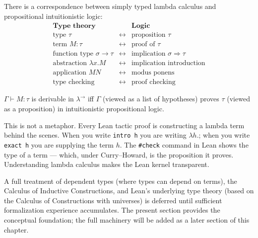 \begin{tcolorbox}[colback=thmbox, colframe=thmborder, arc=2pt,
  left=6pt, right=6pt, top=4pt, bottom=4pt,
  title={\small\textbf{Theorem (Curry--Howard Correspondence)}},
  fonttitle=\small\bfseries]
\label{thm:curry-howard}
There is a correspondence between simply typed lambda calculus
and propositional intuitionistic logic:
\[
  \begin{array}{ccc}
  \textbf{Type theory} & & \textbf{Logic} \\
  \hline
  \text{type } \tau & \longleftrightarrow & \text{proposition } \tau \\
  \text{term } M : \tau & \longleftrightarrow & \text{proof of } \tau \\
  \text{function type } \sigma\to\tau & \longleftrightarrow
    & \text{implication } \sigma\Rightarrow\tau \\
  \text{abstraction } \lambda x.M & \longleftrightarrow
    & \text{implication introduction} \\
  \text{application } MN & \longleftrightarrow
    & \text{modus ponens} \\
  \text{type checking} & \longleftrightarrow & \text{proof checking}
  \end{array}
\]
\end{tcolorbox}

\begin{remark*}
$\Gamma\vdash M:\tau$ is derivable in $\lambda^\to$ iff
$\Gamma$ (viewed as a list of hypotheses) proves $\tau$
(viewed as a proposition) in intuitionistic propositional logic.
\end{remark*}

\begin{remark*}[Flash]
\end{remark*}

\begin{remark*}[Intuition]
This is not a metaphor.  Every Lean tactic proof is constructing a lambda
term behind the scenes.  When you write \texttt{intro h} you are writing
$\lambda h.$; when you write \texttt{exact h} you are supplying the term
$h$.  The \texttt{\#check} command in Lean shows the type of a term ---
which, under Curry--Howard, is the proposition it proves.  Understanding
lambda calculus makes the Lean kernel transparent.
\end{remark*}

\begin{remark*}
A full treatment of dependent types (where types can depend on terms),
the Calculus of Inductive Constructions, and Lean's underlying type
theory (based on the Calculus of Constructions with universes) is
deferred until sufficient formalization experience accumulates.
The present section provides the conceptual foundation; the full
machinery will be added as a later section of this chapter.
\end{remark*}
